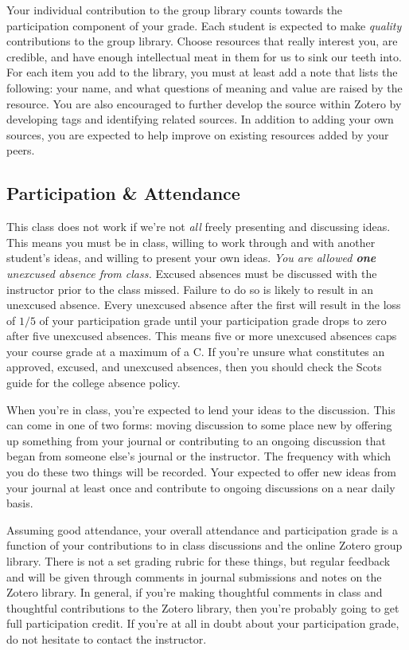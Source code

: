 \documentclass[]{tufte-handout}
\begin{document}
Your individual contribution to the group library counts towards the participation component of your grade. Each student is expected to make \textit{quality} contributions to the group library. Choose resources that really interest you, are credible, and have enough intellectual meat in them for us to sink our teeth into.  For each item you add to the library, you must at least add a note that lists the following: your name, and what questions of meaning and value are raised by the resource. You are also encouraged to further develop the source within Zotero by developing tags and identifying related sources. In addition to adding your own sources, you are expected to help improve on existing resources added by your peers.


\subsection{Participation \& Attendance}

This class does not work if we're not \textit{all} freely presenting and discussing ideas.  This means you must be in class, willing to work through and with another student's ideas, and willing to present your own ideas.  \textit{You are allowed \textbf{one} unexcused absence from class.} Excused absences must be discussed with the instructor prior to the class missed.  Failure to do so is likely to result in an unexcused absence.  Every unexcused absence after the first will result in the loss of $1/5$ of your participation grade until your participation grade drops to zero after five unexcused absences. This means five or more unexcused absences caps your course grade at a maximum of a C. If you're unsure what constitutes an approved, excused, and unexcused absences, then you should check the Scots guide for the college absence policy. 

When you're in class, you're expected to lend your ideas to the discussion.  This can come in one of two forms: moving discussion to some place new by offering up something from your journal or contributing to an ongoing discussion that began from someone else's journal or the instructor. The frequency with which you do these two things will be recorded.  Your expected to offer new ideas from your journal at least once and contribute to ongoing discussions on a near daily basis. 

Assuming good attendance, your overall attendance and participation grade is a function of your contributions to in class discussions and the online Zotero group library.  There is not a set grading rubric for these things, but regular feedback and will be given through comments in journal submissions and notes on the Zotero library.  In general, if you're making thoughtful comments in class and thoughtful contributions to the Zotero library, then you're probably going to get full participation credit. If you're at all in doubt about your participation grade, do not hesitate to contact the instructor.  
\end{document}
